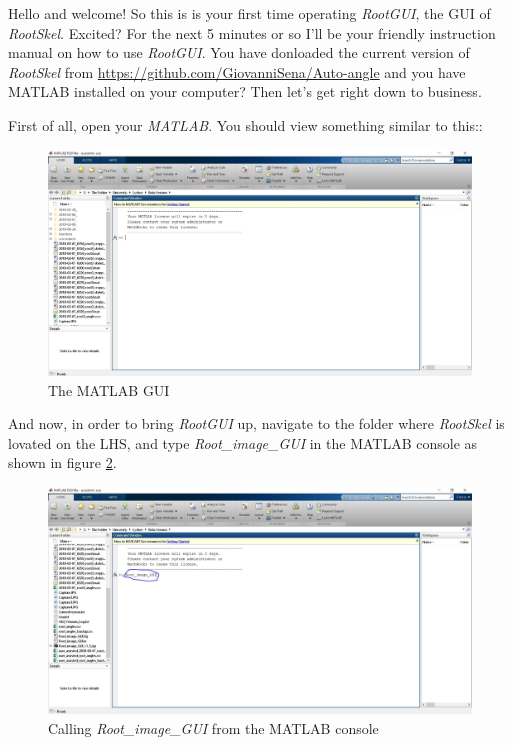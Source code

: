 Hello and welcome! 
So this is is your first time operating \textit{RootGUI}, the GUI of \textit{RootSkel}. Excited?
For the next 5 minutes or so I'll be your friendly instruction manual on how to use \textit{RootGUI}. 
You have donloaded the current version of \textit{RootSkel} from \url{https://github.com/GiovanniSena/Auto-angle} and you have MATLAB installed on your computer? Then let's get right down to business.

First of all, open your \textit{MATLAB}. You should view something similar to this::
\begin{figure}[H]
	\centering
	\includegraphics[width=\textwidth]{../Figures/manual/intro1.jpg}
	\caption{The MATLAB GUI}
	\label{fig:img1}
\end{figure}

And now, in order to bring \textit{RootGUI} up, navigate to the folder where \textit{RootSkel} is lovated on the LHS, and type \textit{Root\_image\_GUI} in the MATLAB console as shown in figure \ref{fig:img2}.
\begin{figure}[H]
	\centering
	\includegraphics[width=\textwidth]{../Figures/manual/intro2.jpg}
	\caption{Calling \textit{Root\_image\_GUI} from the MATLAB console}
	\label{fig:img2}
\end{figure}

